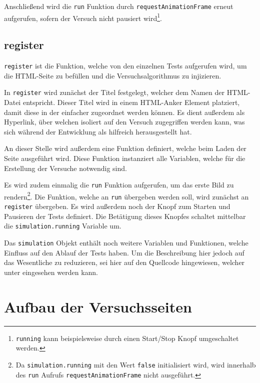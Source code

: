 Anschließend wird die \lstinline{run} Funktion durch \lstinline{requestAnimationFrame} erneut aufgerufen, sofern der Versuch nicht pausiert wird\footnote{\lstinline{running} kann beispielsweise durch einen Start/Stop Knopf umgeschaltet werden.}.

\subsection{register}\label{ch:sim_register}

\lstinline{register} ist die Funktion, welche von den einzelnen Tests aufgerufen wird, um die HTML-Seite zu befüllen und die Versuchsalgorithmus zu injizieren.

In \lstinline{register} wird zunächst der Titel festgelegt, welcher dem Namen der HTML-Datei entspricht.
Dieser Titel wird in einem HTML-Anker Element platziert, damit diese in der  einfacher zugeordnet werden können.
Es dient au{\ss}erdem als Hyperlink, über welchen isoliert auf den Versuch zugegriffen werden kann, was sich während der Entwicklung als hilfreich herausgestellt hat.

An dieser Stelle wird au{\ss}erdem eine Funktion definiert, welche beim Laden der Seite ausgeführt wird.
Diese Funktion instanziert alle Variablen, welche für die Erstellung der Versuche notwendig sind.

Es wird zudem einmalig die \lstinline{run} Funktion aufgerufen, um das erste Bild zu rendern\footnote{Da \lstinline{simulation.running} mit den Wert \lstinline{false} initialisiert wird, wird innerhalb des \lstinline{run} Aufrufs \lstinline{requestAnimationFrame} nicht ausgeführt.}.
Die Funktion, welche an \lstinline{run} übergeben werden soll, wird zunächst an \lstinline{register} übergeben.
Es wird au{\ss}erdem noch der Knopf zum Starten und Pausieren der Tests definiert.
Die Betätigung dieses Knopfes schaltet mittelbar die \lstinline{simulation.running} Variable um.

Das \lstinline{simulation} Objekt enthält noch weitere Variablen und Funktionen, welche Einfluss auf den Ablauf der Tests haben.
Um die Beschreibung hier jedoch auf das Wesentliche zu reduzieren, sei hier auf den Quellcode hingewiesen, welcher unter  eingesehen werden kann.

\section{Aufbau der Versuchsseiten}\label{ch:aufbau_der_testseiten}

